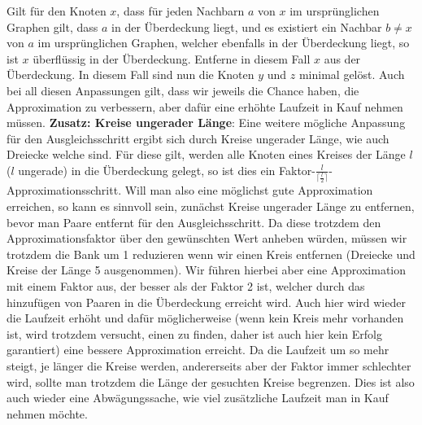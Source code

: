 \documentclass[12pt,onecolumn, notitlepage]{scrartcl}
\begin{document}
Gilt für den Knoten $x$, dass für jeden Nachbarn $a$ von $x$ im ursprünglichen Graphen gilt, dass $a$ in der Überdeckung liegt, und es existiert ein Nachbar $b \neq x$ von $a$ im ursprünglichen Graphen, welcher ebenfalls in der Überdeckung liegt, so ist $x$ überflüssig in der Überdeckung. Entferne in diesem Fall $x$ aus der Überdeckung. In diesem Fall sind nun die Knoten $y$ und $z$ minimal gelöst.\newline\newline
Auch bei all diesen Anpassungen gilt, dass wir jeweils die Chance haben, die Approximation zu verbessern, aber dafür eine erhöhte Laufzeit in Kauf nehmen müssen. \newline \newline
\textbf{Zusatz: Kreise ungerader Länge}:\newline
Eine weitere mögliche Anpassung für den Ausgleichsschritt ergibt sich durch Kreise ungerader Länge, wie auch Dreiecke welche sind. Für diese gilt, werden alle Knoten eines Kreises der Länge $l$ ($l$ ungerade) in die Überdeckung gelegt, so ist dies ein Faktor-$\frac{l}{\lceil \frac{l}{2} \rceil}$-Approximationsschritt.\newline
Will man also eine möglichst gute Approximation erreichen, so kann es sinnvoll sein, zunächst Kreise ungerader Länge zu entfernen, bevor man Paare entfernt für den Ausgleichsschritt. Da diese trotzdem den Approximationsfaktor über den gewünschten Wert anheben würden, müssen wir trotzdem die Bank um 1 reduzieren wenn wir einen Kreis entfernen (Dreiecke und Kreise der Länge 5 ausgenommen). Wir führen hierbei aber eine Approximation mit einem Faktor aus, der besser als der Faktor 2 ist, welcher durch das hinzufügen von Paaren in die Überdeckung erreicht wird. \newline
Auch hier wird wieder die Laufzeit erhöht und dafür möglicherweise (wenn kein Kreis mehr vorhanden ist, wird trotzdem versucht, einen zu finden, daher ist auch hier kein Erfolg garantiert) eine bessere Approximation erreicht. Da die Laufzeit um so mehr steigt, je länger die Kreise werden, andererseits aber der Faktor immer schlechter wird, sollte man trotzdem die Länge der gesuchten Kreise begrenzen. Dies ist also auch wieder eine Abwägungssache, wie viel zusätzliche Laufzeit man in Kauf nehmen möchte. \newline\newline
\end{document}
